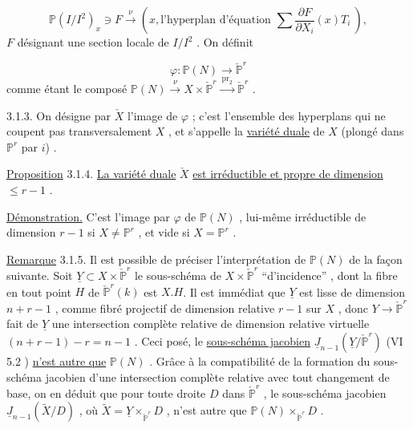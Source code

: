 \begin{equation}\tag{3.1.1}
\mathbb{P}(I/I^2)_x \ni F \xrightarrow{\ \nu\ } (x, \text{l'hyperplan d'équation } \sum \frac{\partial F}{\partial X_i}(x)T_i\ ),
\end{equation}
$F$  désignant une section locale de  $I/I^2$  . On définit

\begin{equation}\tag{3.1.2}
\varphi : \mathbb{P}(N) \longrightarrow \check{\mathbb{P}}^r
\end{equation}
comme étant le composé  $\mathbb{P}(N) \xrightarrow{\ \nu\ } X \times \check{\mathbb{P}}^r \xrightarrow{\ \mathrm{pr}_2\ } \check{\mathbb{P}}^r$ .



3.1.3. On désigne par $\check{X}$ l'image de $\varphi$ ; c'est l'ensemble des hyperplans qui ne coupent pas transversalement $X$ , et s'appelle la \underline{variété duale} de $X$ (plongé dans $\mathbb{P}^r$ par $i$) .

\underline{Proposition} 3.1.4. \underline{La variété duale} $\check{X}$ \underline{est irréductible et propre de dimension} $\leq r-1$ .

\underline{Démonstration.} C'est l'image par $\varphi$ de $\mathbb{P}(N)$ , lui-même irréductible de dimension $r-1$ si $X \neq \mathbb{P}^r$ , et vide si $X = \mathbb{P}^r$ .

\underline{Remarque} 3.1.5. Il est possible de préciser l'interprétation de $\mathbb{P}(N)$ de la façon suivante. Soit $\underline{Y} \subset X \times \check{\mathbb{P}}^r$ le sous-schéma de $X \times \check{\mathbb{P}}^r$ ``d'incidence'' , dont la fibre en tout point $H$ de $\check{\mathbb{P}}^r(k)$ est $X.H$. Il est immédiat que $\underline{Y}$ est lisse de dimension $n+r-1$ , comme fibré projectif de dimension relative $r-1$ sur $X$ , donc $Y \longrightarrow \check{\mathbb{P}}^r$ fait de $\underline{Y}$ une intersection complète relative de dimension relative virtuelle $(n+r-1)-r = n-1$ . Ceci posé, le \underline{sous-schéma jacobien} $\underline{J}_{n-1}(\underline{Y}/\check{\mathbb{P}}^r)$ (VI 5.2 ) \underline{n'est autre que} $\mathbb{P}(N)$ . Grâce à la compatibilité de la formation du sous-schéma jacobien d'une intersection complète relative avec tout changement de base, on en déduit que pour toute droite $D$ dans $\check{\mathbb{P}}^r$ , le sous-schéma jacobien $\underline{J}_{n-1}(\tilde{X}/D)$ , où $\tilde{X} = \underline{Y} \times_{\check{\mathbb{P}}^r} D$ , n'est autre que $\mathbb{P}(N) \times_{\check{\mathbb{P}}^r} D$ .

